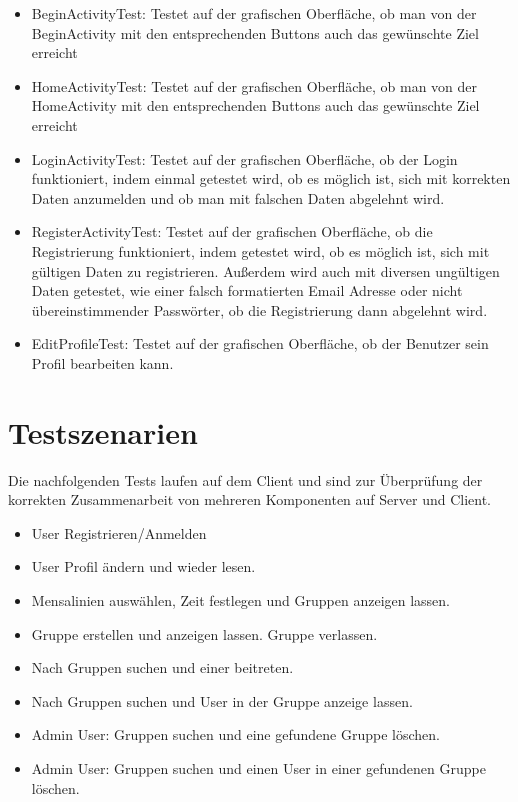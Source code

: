 \documentclass[a4paper]{scrreprt}
\begin{document}
\begin{itemize}
\item BeginActivityTest: Testet auf der grafischen Oberfläche, ob man von der BeginActivity mit den entsprechenden Buttons auch das gewünschte Ziel erreicht
\item HomeActivityTest: Testet auf der grafischen Oberfläche, ob man von der HomeActivity mit den entsprechenden Buttons auch das gewünschte Ziel erreicht
\item LoginActivityTest: Testet auf der grafischen Oberfläche, ob der Login funktioniert, indem einmal getestet wird, ob es möglich ist, sich mit korrekten Daten anzumelden und ob man mit falschen Daten abgelehnt wird.
\item RegisterActivityTest: Testet auf der grafischen Oberfläche, ob die Registrierung funktioniert, indem getestet wird, ob es möglich ist, sich mit gültigen Daten zu registrieren. Außerdem wird auch mit diversen ungültigen Daten getestet, wie einer falsch formatierten Email Adresse oder nicht übereinstimmender Passwörter, ob die Registrierung dann abgelehnt wird.
\item EditProfileTest: Testet auf der grafischen Oberfläche, ob der Benutzer sein Profil bearbeiten kann. 
\end{itemize}

\section{Testszenarien}

Die nachfolgenden Tests laufen auf dem Client und sind zur Überprüfung der korrekten Zusammenarbeit von mehreren Komponenten auf Server und Client.

\begin{itemize}

\item User Registrieren/Anmelden
\item User Profil ändern und wieder lesen.
\item Mensalinien auswählen, Zeit festlegen und Gruppen anzeigen lassen.
\item Gruppe erstellen und anzeigen lassen. Gruppe verlassen.
\item Nach Gruppen suchen und einer beitreten.
\item Nach Gruppen suchen und User in der Gruppe anzeige lassen.
\item Admin User: Gruppen suchen und eine gefundene Gruppe löschen.
\item Admin User: Gruppen suchen und einen User in einer gefundenen Gruppe löschen.

\end{itemize}
\end{document}
